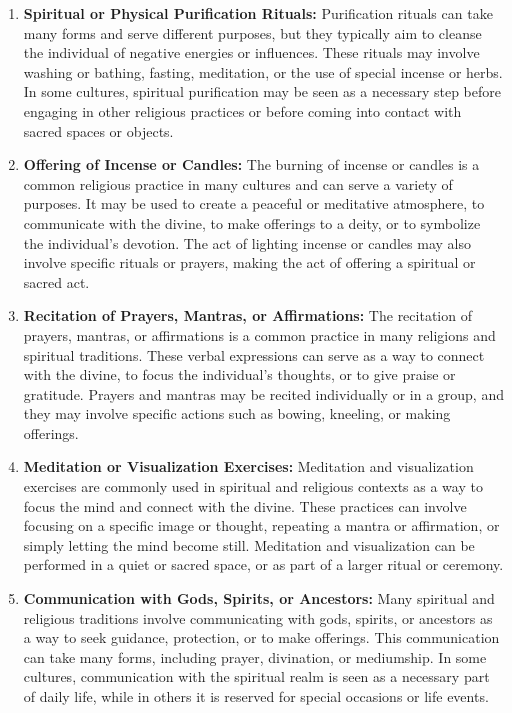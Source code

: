 \documentclass[12pt]{book}
\begin{document}
\begin{enumerate}
    \item \textbf{Spiritual or Physical Purification Rituals:}
    Purification rituals can take many forms and serve different purposes, but they typically aim to cleanse the individual of negative energies or influences. These rituals may involve washing or bathing, fasting, meditation, or the use of special incense or herbs. In some cultures, spiritual purification may be seen as a necessary step before engaging in other religious practices or before coming into contact with sacred spaces or objects.
    
    \item \textbf{Offering of Incense or Candles:}
    The burning of incense or candles is a common religious practice in many cultures and can serve a variety of purposes. It may be used to create a peaceful or meditative atmosphere, to communicate with the divine, to make offerings to a deity, or to symbolize the individual's devotion. The act of lighting incense or candles may also involve specific rituals or prayers, making the act of offering a spiritual or sacred act.
    
    \item \textbf{Recitation of Prayers, Mantras, or Affirmations:}
    The recitation of prayers, mantras, or affirmations is a common practice in many religions and spiritual traditions. These verbal expressions can serve as a way to connect with the divine, to focus the individual's thoughts, or to give praise or gratitude. Prayers and mantras may be recited individually or in a group, and they may involve specific actions such as bowing, kneeling, or making offerings.
    
    \item \textbf{Meditation or Visualization Exercises:}
    Meditation and visualization exercises are commonly used in spiritual and religious contexts as a way to focus the mind and connect with the divine. These practices can involve focusing on a specific image or thought, repeating a mantra or affirmation, or simply letting the mind become still. Meditation and visualization can be performed in a quiet or sacred space, or as part of a larger ritual or ceremony.

    \item \textbf{Communication with Gods, Spirits, or Ancestors:}
    Many spiritual and religious traditions involve communicating with gods, spirits, or ancestors as a way to seek guidance, protection, or to make offerings. This communication can take many forms, including prayer, divination, or mediumship. In some cultures, communication with the spiritual realm is seen as a necessary part of daily life, while in others it is reserved for special occasions or life events.


\end{enumerate}
\end{document}
